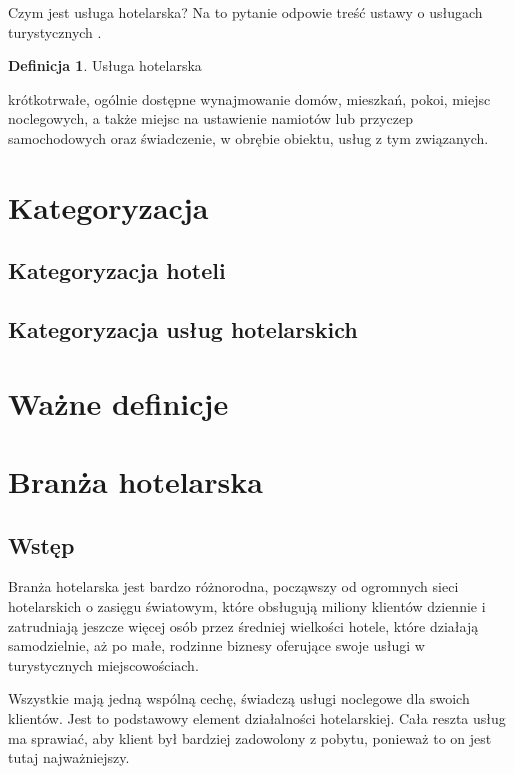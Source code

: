 \documentclass[a4paper,onecolumn,oneside,11pt,wide,floatssmall]{mwrep}
\theoremstyle{definition}
\newtheorem{defn}{Definicja}[section]
\theoremstyle{plain}%
\theoremstyle{remark}
\begin{document}
Czym jest usługa hotelarska? Na to pytanie odpowie treść ustawy o usługach turystycznych \cite{ust:tur}.

\begin{defn}{Usługa hotelarska}

krótkotrwałe, ogólnie dostępne wynajmowanie domów, mieszkań, pokoi, miejsc noclegowych, a także miejsc na ustawienie namiotów lub przyczep samochodowych oraz świadczenie, w obrębie obiektu, usług z tym związanych.

\end{defn}

\section{Kategoryzacja}

\subsection{Kategoryzacja hoteli}

\subsection{Kategoryzacja usług hotelarskich}   

\section{Ważne definicje} 





\section{Branża hotelarska}

\subsection{Wstęp}

Branża hotelarska jest bardzo różnorodna, począwszy od ogromnych sieci
hotelarskich o zasięgu światowym, które obsługują miliony klientów dziennie i zatrudniają
 jeszcze więcej osób przez średniej wielkości hotele, które działają
 samodzielnie, aż po małe, rodzinne biznesy oferujące swoje usługi
 w turystycznych miejscowościach.
 
  Wszystkie mają jedną wspólną cechę,
 świadczą usługi noclegowe dla swoich klientów. Jest to podstawowy element
 działalności hotelarskiej. Cała reszta usług ma sprawiać, aby klient był
 bardziej zadowolony z pobytu, ponieważ to on jest tutaj najważniejszy.
 
\end{document}
